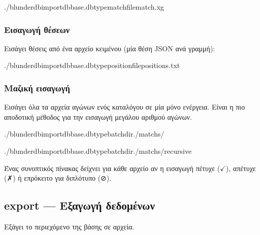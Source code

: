 \documentclass[letterpaper,10pt,greek]{sphinxmanual}
\begin{document}
\begin{sphinxVerbatim}[commandchars=\\\{\}]
./blunderdbimport\PYGZhy{}\PYGZhy{}dbbase.db\PYGZhy{}\PYGZhy{}typematch\PYGZhy{}\PYGZhy{}filematch.xg
\end{sphinxVerbatim}


\subsubsection{Εισαγωγή θέσεων}
\label{\detokenize{cli:import-de-positions}}
\sphinxAtStartPar
Εισάγει θέσεις από ένα αρχείο κειμένου (μία θέση JSON ανά γραμμή):

\begin{sphinxVerbatim}[commandchars=\\\{\}]
./blunderdbimport\PYGZhy{}\PYGZhy{}dbbase.db\PYGZhy{}\PYGZhy{}typeposition\PYGZhy{}\PYGZhy{}filepositions.txt
\end{sphinxVerbatim}


\subsubsection{Μαζική εισαγωγή}
\label{\detokenize{cli:import-par-lot}}
\sphinxAtStartPar
Εισάγει όλα τα αρχεία αγώνων ενός καταλόγου σε μία μόνο ενέργεια. Είναι η πιο αποδοτική μέθοδος για την εισαγωγή μεγάλου αριθμού αγώνων.

\begin{sphinxVerbatim}[commandchars=\\\{\}]
./blunderdbimport\PYGZhy{}\PYGZhy{}dbbase.db\PYGZhy{}\PYGZhy{}typebatch\PYGZhy{}\PYGZhy{}dir./matchs/

./blunderdbimport\PYGZhy{}\PYGZhy{}dbbase.db\PYGZhy{}\PYGZhy{}typebatch\PYGZhy{}\PYGZhy{}dir./matchs/\PYGZhy{}\PYGZhy{}recursive
\end{sphinxVerbatim}

\sphinxAtStartPar
Ένας συνοπτικός πίνακας δείχνει για κάθε αρχείο αν η εισαγωγή πέτυχε (\(\checkmark\)), απέτυχε (✗) ή επρόκειτο για διπλότυπο (⊘).


\subsection{export — Εξαγωγή δεδομένων}
\label{\detokenize{cli:export-exporter-des-donnees}}
\sphinxAtStartPar
Εξάγει το περιεχόμενο της βάσης σε αρχεία.
\end{document}
